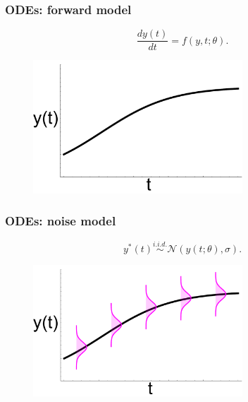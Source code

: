 \documentclass[handout]{beamer}
\begin{document}
\begin{frame}
	\frametitle{ODEs: forward model}

	
	\begin{equation}
	\frac{d y(t)}{dt} = f(y, t; \theta).
	\end{equation}
	
	\begin{figure}
		\centerline{\includegraphics[width=0.7\textwidth]{./Figures/lec7_odeSingleBulding1.pdf}}
	\end{figure}
	
\end{frame}

\begin{frame}
	\frametitle{ODEs: noise model}
	
	
	\begin{equation}
	y^*(t) \stackrel{i.i.d.}{\sim} \mathcal{N}(y(t;\theta), \sigma).
	\end{equation}
	
	\begin{figure}
		\centerline{\includegraphics[width=0.7\textwidth]{./Figures/lec7_odeSingleBulding2.pdf}}
	\end{figure}
	
\end{frame}
\end{document}
